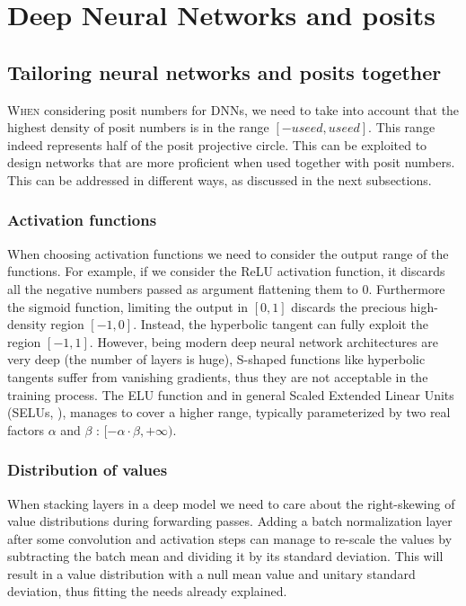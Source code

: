 
\chapter{Deep Neural Networks and posits}\label{chap:posit_networks}
\section{Tailoring neural networks and posits together}

\lettrine{W}{hen} considering posit numbers for DNNs, we need to take into account that the highest density of posit numbers is in the range $[-useed,useed]$. This range indeed represents half of the posit projective circle. This can be exploited to design networks that are more proficient when used together with posit numbers. This can be addressed in different ways, as discussed in the next subsections.

\subsection{Activation functions} When choosing activation functions we need to consider the output range of the functions. For example, if we consider the ReLU activation function, it discards all the negative numbers passed as argument flattening them to $0$. Furthermore the sigmoid function, limiting the output in $[0,1]$ discards the precious high-density region $[-1,0]$. Instead, the hyperbolic tangent can fully exploit the region $[-1,1]$. However, being modern deep neural network architectures are very deep (the number of layers is huge), S-shaped functions like hyperbolic tangents suffer from vanishing gradients, thus they are not acceptable in the training process. The ELU function and in general Scaled Extended Linear Units (SELUs, \cite{NIPS2017_6698}), manages to cover a higher range, typically parameterized by two real factors $\alpha$ and $\beta$ : $[-\alpha \cdot \beta,+\infty)$.

\subsection{Distribution of values} When stacking layers in a deep model we need to care about the right-skewing of value distributions during forwarding passes. Adding a batch normalization layer \cite{Ioffe:2015:BNA:3045118.3045167} after some convolution and activation steps can manage to re-scale the values by subtracting the batch mean and dividing it by its standard deviation. This will result in a value distribution with a null mean value and unitary standard deviation, thus fitting the needs already explained. 

